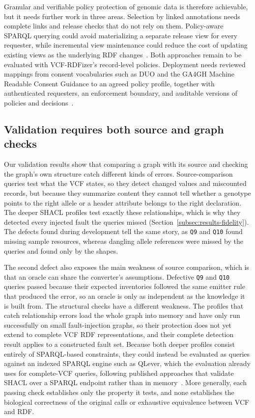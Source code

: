 \documentclass[pdflatex,sn-mathphys-num]{sn-jnl}
\begin{document}
Granular and verifiable policy protection of genomic data is therefore achievable, but it needs further work in three areas.
Selection by linked annotations needs complete links and release checks that do not rely on them.
Policy-aware SPARQL querying could avoid materializing a separate release view for every requester, while incremental view maintenance could reduce the cost of updating existing views as the underlying RDF changes~\cite{khan2017safe,staquet2026incremental}.
Both approaches remain to be evaluated with VCF-RDFizer's record-level policies.
Deployment needs reviewed mappings from consent vocabularies such as DUO and the GA4GH Machine Readable Consent Guidance to an agreed policy profile, together with authenticated requesters, an enforcement boundary, and auditable versions of policies and decisions~\cite{lawson2021duo,ga4gh_mrcg,rehm2021ga4gh,xacml3_2013}.

\subsection{Validation requires both source and graph checks}\label{subsec:disc-validation}
Our validation results show that comparing a graph with its source and checking the graph's own structure catch different kinds of errors.
Source-comparison queries test what the VCF states, so they detect changed values and miscounted records, but because they summarize content they cannot tell whether a genotype points to the right allele or a header attribute belongs to the right declaration.
The deeper SHACL profiles test exactly these relationships, which is why they detected every injected fault the queries missed (Section~\ref{subsec:results-fidelity}).
The defects found during development tell the same story, as \texttt{Q9} and \texttt{Q10} found missing sample resources, whereas dangling allele references were missed by the queries and found only by the shapes.

The second defect also exposes the main weakness of source comparison, which is that an oracle can share the converter's assumptions.
Defective \texttt{Q9} and \texttt{Q10} queries passed because their expected inventories followed the same emitter rule that produced the error, so an oracle is only as independent as the knowledge it is built from.
The structural checks have a different weakness.
The profiles that catch relationship errors load the whole graph into memory and have only run successfully on small fault-injection graphs, so their protection does not yet extend to complete VCF RDF representations, and their complete detection result applies to a constructed fault set.
Because both deeper profiles consist entirely of SPARQL-based constraints, they could instead be evaluated as queries against an indexed SPARQL engine such as QLever, which the evaluation already uses for complete-VCF queries, following published approaches that validate SHACL over a SPARQL endpoint rather than in memory~\cite{corman2019validating,figuera2021travshacl}.
More generally, each passing check establishes only the property it tests, and none establishes the biological correctness of the original calls or exhaustive equivalence between VCF and RDF.
\end{document}
